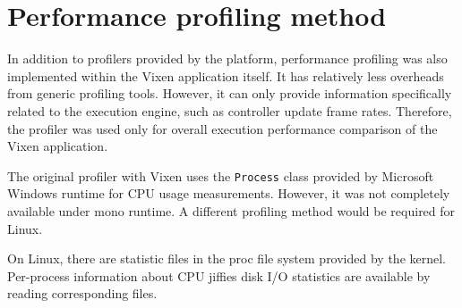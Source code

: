 \section{Performance profiling method}

In addition to profilers provided by the platform, performance profiling was also implemented within the Vixen application itself. It has relatively less overheads from generic profiling tools. However, it can only provide information specifically related to the execution engine, such as controller update frame rates. Therefore, the profiler was used only for overall execution performance comparison of the Vixen application.

The original profiler with Vixen uses the \texttt{Process} class provided by Microsoft Windows runtime for CPU usage measurements. However, it was not completely available under mono runtime. A different profiling method would be required for Linux.

On Linux, there are statistic files in the proc file system \cite{proc} provided by the kernel. Per-process information about CPU jiffies  disk I/O statistics are available by reading corresponding files.

